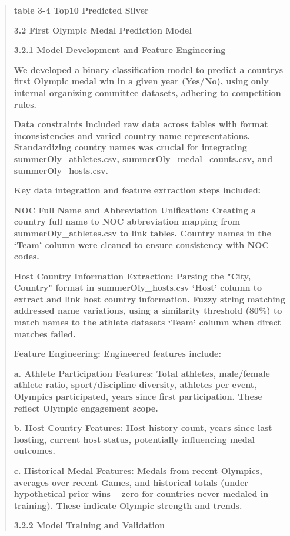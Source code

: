 \documentclass[12pt,a4paper]{article}
\renewenvironment{quote}{\begin{quotation}}{\end{quotation}}  %
\begin{document}
    \begin{quote}
    \textbf{table 3-4 Top10 Predicted Silver}
    
    \protect{}\label{bookmark12-1}{}\textbf{3.2 First Olympic
    Medal Prediction Model}
    
    \protect{}\label{bookmark13-1}{}\textbf{3.2.1 Model
    Development and Feature Engineering}
    
    \textbf{We developed a binary classification model to predict a
    country\textquotesingle s first Olympic medal win in a given year
    (Yes/No), using only internal organizing committee datasets, adhering to
    competition rules.}
    
    \textbf{Data constraints included raw data across tables with format
    inconsistencies and varied country name representations. Standardizing
    country names was crucial for integrating summerOly\_athletes.csv,
    summerOly\_medal\_counts.csv, and summerOly\_hosts.csv.}
    
    \textbf{Key data integration and feature extraction steps included:}
    
    \textbf{NOC Full Name and Abbreviation Unification: Creating a country
    full name to NOC abbreviation mapping from summerOly\_athletes.csv to
    link tables. Country names in the `Team' column were cleaned to ensure
    consistency with NOC codes.}
    
    \textbf{Host Country Information Extraction: Parsing the "City, Country"
    format in summerOly\_hosts.csv `Host' column to extract and link host
    country information. Fuzzy string matching addressed name variations,
    using a similarity threshold (80\%) to match names to the athlete
    dataset\textquotesingle s `Team' column when direct matches failed.}
    
    \textbf{Feature Engineering: Engineered features include:}
    
    \textbf{a. Athlete Participation Features: Total athletes, male/female
    athlete ratio, sport/discipline diversity, athletes per event, Olympics
    participated, years since first participation. These reflect Olympic
    engagement scope.}
    
    \textbf{b. Host Country Features: Host history count, years since last
    hosting, current host status, potentially influencing medal outcomes.}
    
    \textbf{c. Historical Medal Features: Medals from recent Olympics,
    averages over recent Games, and historical totals (under hypothetical
    prior wins -- zero for countries never medaled in training). These
    indicate Olympic strength and trends.}
    
    \protect{}\label{bookmark31}{}\textbf{3.2.2 Model Training
    and Validation}
    \end{quote}
    
\end{document}
